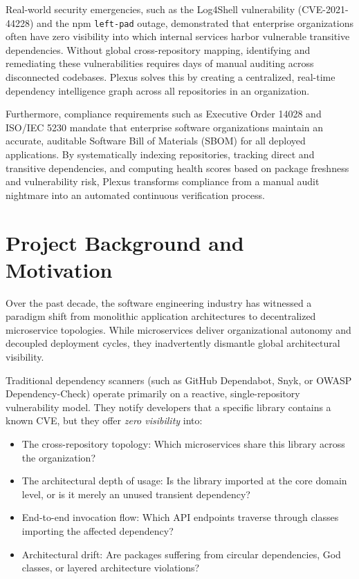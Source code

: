 \documentclass[11pt,a4paper,openany]{report}
\begin{document}
Real-world security emergencies, such as the Log4Shell vulnerability (CVE-2021-44228) and the npm \texttt{left-pad} outage, demonstrated that enterprise organizations often have zero visibility into which internal services harbor vulnerable transitive dependencies. Without global cross-repository mapping, identifying and remediating these vulnerabilities requires days of manual auditing across disconnected codebases. Plexus solves this by creating a centralized, real-time dependency intelligence graph across all repositories in an organization.

Furthermore, compliance requirements such as Executive Order 14028 and ISO/IEC 5230 mandate that enterprise software organizations maintain an accurate, auditable Software Bill of Materials (SBOM) for all deployed applications. By systematically indexing repositories, tracking direct and transitive dependencies, and computing health scores based on package freshness and vulnerability risk, Plexus transforms compliance from a manual audit nightmare into an automated continuous verification process.

\section{Project Background and Motivation}
Over the past decade, the software engineering industry has witnessed a paradigm shift from monolithic application architectures to decentralized microservice topologies. While microservices deliver organizational autonomy and decoupled deployment cycles, they inadvertently dismantle global architectural visibility. 

Traditional dependency scanners (such as GitHub Dependabot, Snyk, or OWASP Dependency-Check) operate primarily on a reactive, single-repository vulnerability model. They notify developers that a specific library contains a known CVE, but they offer \textit{zero visibility} into:
\begin{itemize}[leftmargin=1.2cm]
    \item The cross-repository topology: Which microservices share this library across the organization?
    \item The architectural depth of usage: Is the library imported at the core domain level, or is it merely an unused transient dependency?
    \item End-to-end invocation flow: Which API endpoints traverse through classes importing the affected dependency?
    \item Architectural drift: Are packages suffering from circular dependencies, God classes, or layered architecture violations?
\end{itemize}
\end{document}
